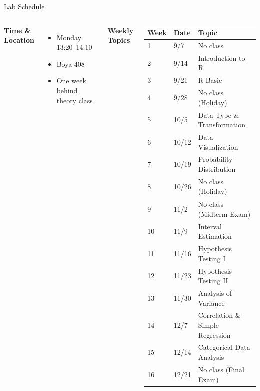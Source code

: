 \documentclass{beamer}					%
\begin{document}
\begin{frame}{Lab Schedule}

  \begin{columns}[T]

    \textbf{Time \& Location}

    \vspace{0.5em}
    \begin{itemize}
      \item Monday 13:20--14:10
      \item Boya 408
      \item One week behind theory class
    \end{itemize}

    \textbf{Weekly Topics}

    \vspace{0.5em}

    \small
    \renewcommand{\arraystretch}{1.0}
    \begin{tabular}{lll}
      \toprule
      \textbf{Week} & \textbf{Date} & \textbf{Topic} \\
      \midrule
      1  & 9/7 & No class \\
      2  & 9/14 & Introduction to R \\
      3  & 9/21 & R Basic \\
      4  & 9/28 & No class (Holiday) \\
      5  & 10/5 & Data Type \& Transformation \\
      6  & 10/12 & Data Visualization\\
      7  & 10/19 & Probability Distribution \\
      8  & 10/26 & No class (Holiday) \\
      9  & 11/2 & No class (Midterm Exam) \\
      10 & 11/9 & Interval Estimation\\
      11 & 11/16 & Hypothesis Testing I \\
      12 & 11/23 & Hypothesis Testing II\\
      13 & 11/30 & Analysis of Variance\\
      14 & 12/7  & Correlation \& Simple Regression \\
      15 & 12/14 & Categorical Data Analysis \\
      16 & 12/21 & No class (Final Exam)  \\
      \bottomrule
    \end{tabular}
  \end{columns}
\end{frame}
\end{document}
